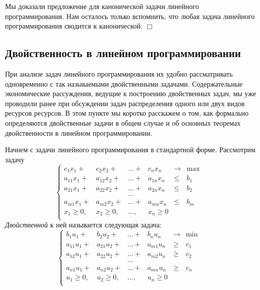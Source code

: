     Мы доказали предложение для канонической задачи линейного
    программирования. Нам осталось только вспомнить, что любая
    задача линейного программирования сводится к канонической.
    $\Box$





\subsection{Двойственность в линейном программировании}

    При анализе задач линейного программирования их удобно
    рассматривать одновременно с так называемыми двойственными задачами.
    Содержательные экономические рассуждения, ведущие к построению
    двойственных задач, мы уже проводили ранее при обсуждении задач
    распределения одного или двух видов ресурсов ресурсов.
    В этом пункте мы коротко расскажем о том, как формально определяются
    двойственные задачи в общем случае и об
    основных теоремах двойственности в линейном программировании.

    Начнем с задачи линейного программирования в стандартной форме.
    Рассмотрим задачу
    \begin{equation} \label{SZLP-1}
\left\{
\begin{array}{rcrrrrllll}
     c_1 x_1 + & c_2 x_2 +    & \ldots +& c_n x_n &\to & \max\\
     a_{11} x_1 + & a_{12} x_2 + &\ldots +& a_{1n} x_n &\leqslant& b_1 \\
     a_{21} x_1 + & a_{22} x_2 + &\ldots +& a_{2n} x_n &\leqslant& b_2\\
                      && \ldots &&&&\\
     a_{m1} x_1 + & a_{m2} x_2 +& \ldots +& a_{mn} x_n &\leqslant& b_m\\
     x_1 \geqslant 0,   & x_2 \geqslant 0,  & \ldots,&  x_n \geqslant 0\\
\end{array} \right.
\end{equation}
    \emph{Двойственной} к ней называется следующая задача:
\begin{equation} \label{SZLP-1-dual}
\left\{
\begin{array}{rcrrrrllll}
     b_1 u_1 + & b_2 u_2 +    & \ldots +& b_n u_n &\to & \min\\
     a_{11} u_1 + & a_{21} u_2 + &\ldots +& a_{m1} u_n &\geqslant& c_1 \\
     a_{12} u_1 + & a_{22} u_2 + &\ldots +& a_{m2} u_n &\geqslant& c_2\\
                      && \ldots &&&&\\
     a_{n1} u_1 + & a_{n2} u_2 +& \ldots +& a_{mn} u_n &\geqslant& c_n\\
     u_1 \geqslant 0,   & u_2 \geqslant 0,  & \ldots,&  u_n \geqslant 0\\
\end{array} \right.
\end{equation}


